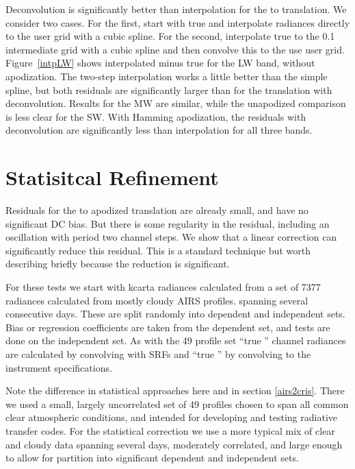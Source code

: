 \documentclass[11pt]{article}
\begin{document}
Deconvolution is significantly better than interpolation for the
{\airs} to {\cris} translation.  We consider two cases.  For the
first, start with true {\airs} and interpolate radiances directly 
to the {\cris} user grid with a cubic spline.  For the second,
interpolate true {\airs} to the 0.1 {\wn} intermediate grid with a
cubic spline and then convolve this to the use {\cris} user grid.
Figure~\ref{intpLW} shows interpolated {\cris} minus true {\cris}
for the LW band, without apodization.  The two-step interpolation
works a little better than the simple spline, but both residuals are
significantly larger than for the translation with deconvolution.
Results for the MW are similar, while the unapodized comparison is
less clear for the SW.  With Hamming apodization, the residuals with
deconvolution are significantly less than interpolation for all
three bands.

\FloatBarrier
\section{Statisitcal Refinement}
\label{statfix}

Residuals for the {\airs} to apodized {\cris} translation are
already small, and have no significant DC bias.  But there is some
regularity in the residual, including an oscillation with period two
channel steps.  We show that a linear correction can significantly
reduce this residual.  This is a standard technique but worth
describing briefly because the reduction is significant.

For these tests we start with kcarta radiances calculated from a 
set of 7377 radiances calculated from mostly cloudy AIRS profiles.
spanning several consecutive days.  These are split randomly into
dependent and independent sets.  Bias or regression coefficients are
taken from the dependent set, and tests are done on the independent
set.  As with the 49 profile set ``true {\airs}'' channel radiances
are calculated by convolving with {\airs} SRFs and ``true {\cris}''
by convolving to the {\cris} instrument specifications.

Note the difference in statistical approaches here and in section
\ref{airs2cris}.  There we used a small, largely uncorrelated set of
49 profiles chosen to span all common clear atmospheric conditions,
and intended for developing and testing radiative transfer codes.
For the statistical correction we use a more typical mix of clear
and cloudy data spanning several days, moderately correlated, and
large enough to allow for partition into significant dependent and
independent sets.
\end{document}

